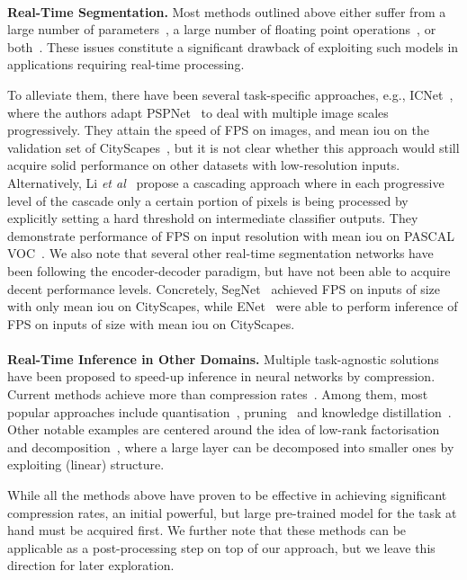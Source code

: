 \documentclass{bmvc2k}
\def\etal{\emph{et al}\bmvaOneDot}
\begin{document}
\\
\textbf{Real-Time Segmentation.} Most methods outlined above either suffer from a large number of parameters~\cite{LinMSR17}, a large number of floating point operations~\cite{ChenPKMY14,ChenPK0Y16,ChenPSA17,ZhaoSQWJ17}, or both~\cite{PaszkeCKC16,NohHH15,LongSD15,YangLZ17}. These issues constitute a significant drawback of exploiting such models in applications requiring real-time processing.

To alleviate them, there have been several task-specific approaches, e.g., ICNet~\cite{ZhaoQSSJ17}, where the authors adapt PSPNet~\cite{ZhaoSQWJ17} to deal with multiple image scales progressively. 
They attain the speed of  FPS on  images, and  mean iou on the validation set of CityScapes~\cite{CordtsORREBFRS16}, but it is not clear whether this approach would still acquire solid performance on other datasets with low-resolution inputs. Alternatively, Li \etal~\cite{LiLLLT17} propose a cascading approach where in each progressive level of the cascade only a certain portion of pixels is being processed by explicitly setting a hard threshold on intermediate classifier outputs. They demonstrate performance of  FPS on  input resolution with  mean iou on PASCAL VOC~\cite{EveringhamGWWZ10}. We also note that several other real-time segmentation networks have been following the encoder-decoder paradigm, but have not been able to acquire decent performance levels. Concretely, SegNet~\cite{BadrinarayananH15} achieved  FPS on inputs of size  with only  mean iou on CityScapes, while ENet~\cite{PaszkeCKC16} were able to perform inference of  FPS on inputs of size  with  mean iou on CityScapes.\\
\\
\textbf{Real-Time Inference in Other Domains.} Multiple task-agnostic solutions have been proposed to speed-up inference in neural networks by compression. Current methods achieve more than  compression rates~\cite{IandolaMAHDK16}. Among them, most popular approaches include quantisation~\cite{GongLYB14,ZhouNZWWZ16,ZhouYGXC17}, pruning~\cite{HanPTD15,CunDS89,HassibiS92,HanMD15} and knowledge distillation~\cite{BaC14,HintonVD15,BucilaCN06,RomeroBKCGB14}.
Other notable examples are centered around the idea of low-rank factorisation and decomposition~\cite{DentonZBLF14,JaderbergVZ14}, where a large layer can be decomposed into smaller ones by exploiting (linear) structure. 
	
While all the methods above have proven to be effective in achieving significant compression rates, an initial powerful, but large pre-trained model for the task at hand must be acquired first. We further note that these methods can be applicable as a post-processing step on top of our approach, but we leave this direction for later exploration.
\end{document}
